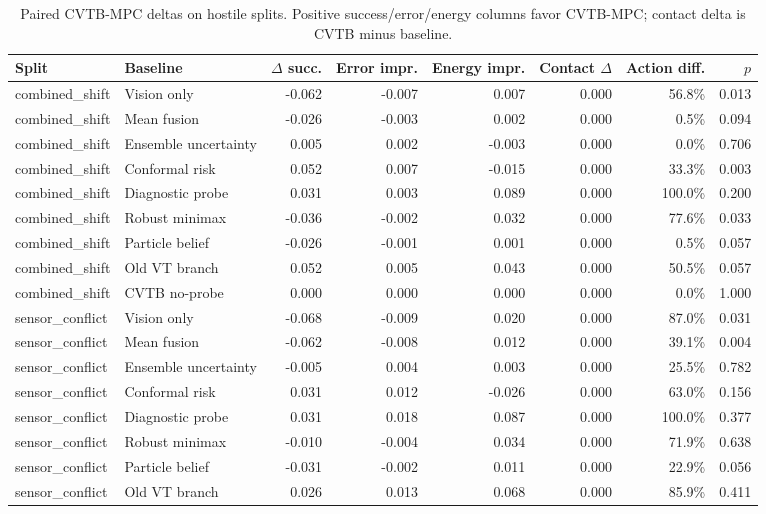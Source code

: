 \begin{table}[t]
\centering
\caption{Paired CVTB-MPC deltas on hostile splits. Positive success/error/energy columns favor CVTB-MPC; contact delta is CVTB minus baseline.}
\label{tab:hostile-pairwise}
\scriptsize
\begin{tabular}{llrrrrrr}
\toprule
Split & Baseline & $\Delta$ succ. & Error impr. & Energy impr. & Contact $\Delta$ & Action diff. & $p$ \\
\midrule
combined\_shift & Vision only & -0.062 & -0.007 & 0.007 & 0.000 & 56.8\% & 0.013 \\
combined\_shift & Mean fusion & -0.026 & -0.003 & 0.002 & 0.000 & 0.5\% & 0.094 \\
combined\_shift & Ensemble uncertainty & 0.005 & 0.002 & -0.003 & 0.000 & 0.0\% & 0.706 \\
combined\_shift & Conformal risk & 0.052 & 0.007 & -0.015 & 0.000 & 33.3\% & 0.003 \\
combined\_shift & Diagnostic probe & 0.031 & 0.003 & 0.089 & 0.000 & 100.0\% & 0.200 \\
combined\_shift & Robust minimax & -0.036 & -0.002 & 0.032 & 0.000 & 77.6\% & 0.033 \\
combined\_shift & Particle belief & -0.026 & -0.001 & 0.001 & 0.000 & 0.5\% & 0.057 \\
combined\_shift & Old VT branch & 0.052 & 0.005 & 0.043 & 0.000 & 50.5\% & 0.057 \\
combined\_shift & CVTB no-probe & 0.000 & 0.000 & 0.000 & 0.000 & 0.0\% & 1.000 \\
sensor\_conflict & Vision only & -0.068 & -0.009 & 0.020 & 0.000 & 87.0\% & 0.031 \\
sensor\_conflict & Mean fusion & -0.062 & -0.008 & 0.012 & 0.000 & 39.1\% & 0.004 \\
sensor\_conflict & Ensemble uncertainty & -0.005 & 0.004 & 0.003 & 0.000 & 25.5\% & 0.782 \\
sensor\_conflict & Conformal risk & 0.031 & 0.012 & -0.026 & 0.000 & 63.0\% & 0.156 \\
sensor\_conflict & Diagnostic probe & 0.031 & 0.018 & 0.087 & 0.000 & 100.0\% & 0.377 \\
sensor\_conflict & Robust minimax & -0.010 & -0.004 & 0.034 & 0.000 & 71.9\% & 0.638 \\
sensor\_conflict & Particle belief & -0.031 & -0.002 & 0.011 & 0.000 & 22.9\% & 0.056 \\
sensor\_conflict & Old VT branch & 0.026 & 0.013 & 0.068 & 0.000 & 85.9\% & 0.411 \\

\end{tabular}
\end{table}
